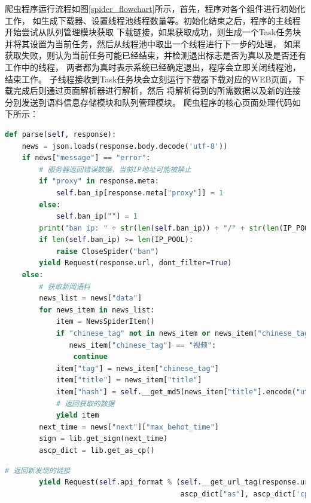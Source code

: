 \documentclass{standalone}
\begin{document}
爬虫程序运行流程如图\ref{spider_flowchart}所示，首先，程序对各个组件进行初始化工作，
如生成下载器、设置线程池线程数量等。初始化结束之后，程序的主线程开始尝试从队列管理模块获取
下载链接，如果获取成功，则生成一个Task任务块并将其设置为当前任务，然后从线程池中取出一个线程进行下一步的处理，
如果获取失败，则认为当前任务可能已经结束，并检测退出标志是否为真以及是否还有工作中的线程，
两者都为真时表示系统已经确定退出，程序会立即关闭线程池，结束工作。
子线程接收到Task任务块会立刻运行下载器下载对应的WEB页面，下载完成后则通过页面解析器进行解析，然后
将解析得到的所需数据以及新的连接分别发送到语料信息存储模块和队列管理模块。
爬虫程序的核心页面处理代码如下所示：
\begin{lstlisting}[language={Python},frame=shadowbox,rulesepcolor=\color{red!0!green!0!blue!0}] 
    def parse(self, response):
    news = json.loads(response.body.decode('utf-8'))
    if news["message"] == "error":
        # 服务器返回错误数据，当前IP地址可能被禁止
        if "proxy" in response.meta:
            self.ban_ip[response.meta["proxy"]] = 1
        else:
            self.ban_ip[""] = 1
        print("ban ip: " + str(len(self.ban_ip)) + "/" + str(len(IP_POOL)))
        if len(self.ban_ip) >= len(IP_POOL):
            raise CloseSpider("ban")
        yield Request(response.url, dont_filter=True)
    else:
        # 获取新闻语料
        news_list = news["data"]
        for news_item in news_list:
            item = NewsSpiderItem()
            if "chinese_tag" not in news_item or news_item["chinese_tag"] == "其他" or \
               news_item["chinese_tag"] == "视频":
                continue
            item["tag"] = news_item["chinese_tag"]
            item["title"] = news_item["title"]
            item["hash"] = self.__get_md5(news_item["title"].encode("utf-8"))
            # 返回获取的数据
            yield item
        next_time = news["next"]["max_behot_time"]
        sign = lib.get_sign(next_time)
        ascp_dict = lib.get_as_cp()
\end{lstlisting}
\begin{lstlisting}[language={Python},frame=shadowbox,rulesepcolor=\color{red!0!green!0!blue!0}] 
        # 返回新发现的链接
        yield Request(self.api_format % (self.__get_url_tag(response.url), next_time, next_time,
                                         ascp_dict["as"], ascp_dict['cp'], sign))
\end{lstlisting}
\end{document}
